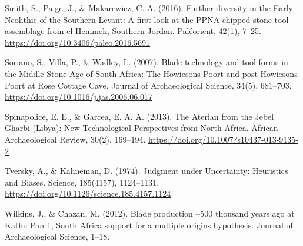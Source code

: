 \documentclass[
]{article}
\begin{document}
Smith, S., Paige, J., \& Makarewicz, C. A. (2016). Further diversity in
the Early Neolithic of the Southern Levant: A first look at the PPNA
chipped stone tool assemblage from el-Hemmeh, Southern Jordan.
Paléorient, 42(1), 7--25. \url{https://doi.org/10.3406/paleo.2016.5691}

Soriano, S., Villa, P., \& Wadley, L. (2007). Blade technology and tool
forms in the Middle Stone Age of South Africa: The Howiesons Poort and
post-Howiesons Poort at Rose Cottage Cave. Journal of Archaeological
Science, 34(5), 681--703.
\url{https://doi.org/10.1016/j.jas.2006.06.017}

Spinapolice, E. E., \& Garcea, E. A. A. (2013). The Aterian from the
Jebel Gharbi (Libya): New Technological Perspectives from North Africa.
African Archaeological Review, 30(2), 169--194.
\url{https://doi.org/10.1007/s10437-013-9135-2}

Tversky, A., \& Kahneman, D. (1974). Judgment under Uncertainty:
Heuristics and Biases. Science, 185(4157), 1124--1131.
\url{https://doi.org/10.1126/science.185.4157.1124}

Wilkins, J., \& Chazan, M. (2012). Blade production \textasciitilde500
thousand years ago at Kathu Pan 1, South Africa support for a multiple
origins hypothesis. Journal of Archaeological Science, 1--18.
\end{document}
